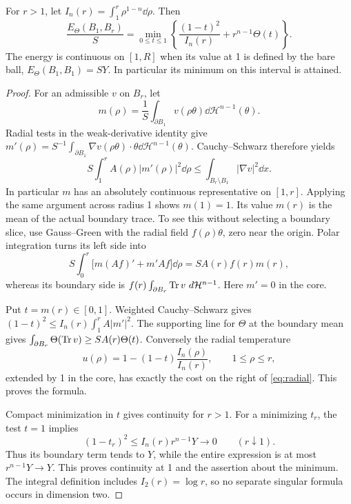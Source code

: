 \begin{lemma}\label{lem:radial}
For \(r>1\), let \(I_n(r)=\int_1^r \rho^{1-n}\dd\rho\). Then
\begin{equation}\label{eq:radial}
 \frac{E_\Theta(B_1,B_r)}{S}
 =\min_{0\le t\le1}\left\{\frac{(1-t)^2}{I_n(r)}+
                                      r^{n-1}\Theta(t)\right\}.
\end{equation}
The energy is continuous on \([1,R]\) when its value at 1 is defined
by the bare ball, \(E_\Theta(B_1,B_1)=S Y\). In particular its minimum
on this interval is attained.
\end{lemma}

\begin{proof}
For an admissible \(v\) on \(B_r\), let
\[
 m(\rho)=\frac1S\int_{\partial B_1}v(\rho\theta)
                                      \dd\mathcal H^{n-1}(\theta).
\]
Radial tests in the weak-derivative identity give
\(m'(\rho)=S^{-1}\int_{\partial B_1}\nabla v(\rho\theta)\cdot\theta
\dd\mathcal H^{n-1}(\theta)\). Cauchy--Schwarz therefore yields
\[
 S\int_1^r A(\rho)|m'(\rho)|^2\dd\rho
 \le\int_{B_r\setminus B_1}|\nabla v|^2\dd x.
\]
In particular \(m\) has an absolutely continuous representative on
\([1,r]\). Applying the same argument across radius 1 shows \(m(1)=1\).
Its value \(m(r)\) is the mean of the actual boundary trace. To see this
without selecting a boundary slice, use Gauss--Green with the radial
field \(f(\rho)\theta\), zero near the origin. Polar integration turns
its left side into
\[
 S\int_0^r\bigl[m(Af)'+m'Af\bigr]\dd\rho
       =S A(r)f(r)m(r),
\]
whereas its boundary side is
\(f(r)\int_{\partial B_r}\operatorname{Tr} v\,\,d\mathcal H^{n-1}\).
Here \(m'=0\) in the core.

Put \(t=m(r)\in[0,1]\). Weighted Cauchy--Schwarz gives
\((1-t)^2\le I_n(r)\int_1^r A|m'|^2\).
The supporting line for \(\Theta\) at the boundary mean gives
\(\int_{\partial B_r}\Theta(\operatorname{Tr} v)\ge S A(r)\Theta(t)\).
Conversely the radial temperature
\[
 u(\rho)=1-(1-t)\frac{I_n(\rho)}{I_n(r)},\qquad 1\le\rho\le r,
\]
extended by 1 in the core, has exactly the cost on the right of
\eqref{eq:radial}. This proves the formula.

Compact minimization in \(t\) gives continuity for \(r>1\).
For a minimizing \(t_r\), the test \(t=1\) implies
\[
 (1-t_r)^2\le I_n(r)r^{n-1}Y\longrightarrow0\qquad(r\downarrow1).
\]
Thus its boundary term tends to \(Y\), while the entire expression
is at most \(r^{n-1}Y\to Y\). This proves continuity at 1 and the
assertion about the minimum. The integral definition includes
\(I_2(r)=\log r\), so no separate singular formula occurs in dimension two.
\end{proof}

